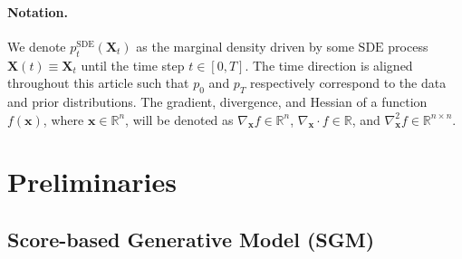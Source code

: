 \documentclass{article}
\def\rvX{{\mathbf{X}}}
\def\vx{{\bm{x}}}
\newcommand{\pdata}{p_{\rm{data}}}
\begin{document}
\paragraph*{Notation.}
We denote $p_{t}^{\mathrm{SDE}}(\rvX_t)$ as the marginal density driven by some $\mathrm{SDE}$ process $\rvX(t)\equiv \rvX_t$ until the time step $t\in[0,T]$.
The time direction is aligned throughout this article such that
$p_0$ and $p_T$ respectively correspond to the data and
prior distributions.
{
    The gradient, divergence, and Hessian of a function $f(\vx)$, where $\vx \in \mathbb{R}^n$, will be denoted as
    $\nabla_\vx f \in \mathbb{R}^n $, $\nabla_\vx \cdot f \in \mathbb{R}$, and $\nabla^2_{\vx} f \in \mathbb{R}^{n\times n}$.
}



















 
\vspace{-4pt}
\section{Preliminaries} \label{sec:2}



\newcommand{\score}[2]{\nabla \log p_{#1}(#2)}
\def\pdata{{ p_\text{\normalfont{data}} }}
\def\prior{{ p_\text{\normalfont{prior}} }}
\newcommand{\pp}[2]{p_{#1}^{\text{\normalfont{#2}}}}



\vspace{-4pt}

\subsection{Score-based Generative Model (SGM)}

\vspace{-4pt}
\end{document}
